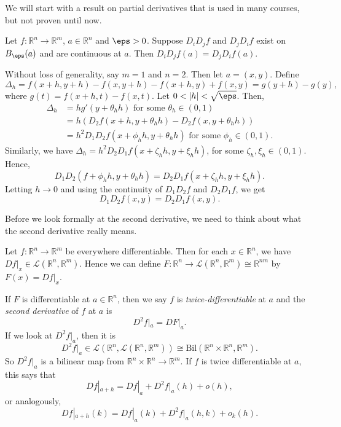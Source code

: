 \documentclass[12pt]{article}
\begin{document}
We will start with a result on partial derivatives that is used in many courses, but not proven until now.

\begin{theorem}
	Let $f : \mathbb{R}^{n} \to \mathbb{R}^{m}$, $a \in \mathbb{R}^{n}$ and $\eps > 0$. Suppose $D_iD_jf$ and $D_jD_if$ exist on $B_{\eps}(a)$ and are continuous at $a$. Then $D_iD_jf(a) = D_jD_if(a)$.
\end{theorem}

\begin{proofbox}
	Without loss of generality, say $m = 1$ and $n = 2$. Then let $a = (x, y)$. Define
	\[
	\Delta_h = f(x+h, y+h) - f(x, y+h) - f(x+h, y) + f(x, y) = g(y + h) - g(y)
	,\]
	where $g(t) = f(x+h, t) - f(x, t)$. Let $0 < |h| < \sqrt \eps$. Then,
	\begin{align*}
		\Delta_h &= h g'(y+\theta_h h) \text{ for some } \theta_h \in (0, 1) \\
			 &= h(D_2 f(x+h, y+\theta_h h) - D_2f(x, y + \theta_h h)) \\
			 &= h^2D_1D_2f(x+\phi_h h, y + \theta_h h) \text{ for some } \phi_h \in (0, 1).
	\end{align*}
	Similarly, we have $\Delta_h = h^2D_2D_1f(x+\zeta_h h, y+\xi_h h)$, for some $\zeta_h, \xi_h \in (0, 1)$. Hence,
	\[
	D_1 D_2(f + \phi_h h, y + \theta_h h) = D_2 D_1f(x + \zeta_h h, y + \xi_h h)
	.\]
	Letting $h \to 0$ and using the continuity of $D_1D_2f$ and $D_2D_1f$, we get
	\[
	D_1D_2f(x, y) = D_2D_1f(x, y)
	.\]
\end{proofbox}

Before we look formally at the second derivative, we need to think about what the second derivative really means.

Let $f : \mathbb{R}^{n} \to \mathbb{R}^{m}$ be everywhere differentiable. Then for each $x \in \mathbb{R}^{n}$, we have $Df|_x \in \mathcal{L}(\mathbb{R}^{n}, \mathbb{R}^{m})$. Hence we can define $F : \mathbb{R}^{n} \to \mathcal{L} (\mathbb{R}^{n}, \mathbb{R}^{m}) \cong \mathbb{R}^{nm}$ by $F(x) = Df|_x$.

If $F$ is differentiable at $a \in \mathbb{R}^{n}$, then we say $f$ is \textit{twice-differentiable} at $a$ and the \textit{second derivative} of $f$ at $a$ is
\[
D^2f|_a = DF|_a
.\]
If we look at $D^2f|_a$, then it is
\[
	D^2f|_a \in \mathcal{L}(\mathbb{R}^{n}, \mathcal{L}(\mathbb{R}^{n}, \mathbb{R}^{m})) \cong \mathrm{Bil}(\mathbb{R}^{n} \times \mathbb{R}^{n} , \mathbb{R}^{m})
.\]
So $D^2f|_a$ is a bilinear map from $\mathbb{R}^{n} \times \mathbb{R}^{n} \to \mathbb{R}^{m}$. If $f$ is twice differentiable at $a$, this says that
\[
Df|_{a+h} = Df|_a + D^2f|_a(h) + o(h)
,\]
or analogously,
\[
Df|_{a+h}(k) = Df|_a(k) + D^2f|_a(h,k) + o_k(h)
.\]
\end{document}
